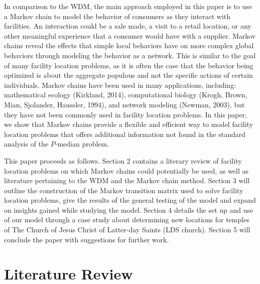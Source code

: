 \documentclass[twoside,twocolumn]{article}
\begin{document}
In comparison to the WDM, the main approach employed in this paper is to use a Markov chain to model the behavior of consumers as they interact with facilities. 
An interaction could be a sale made, a visit to a retail location, or any other meaningful experience that a consumer would have with a supplier. %
Markov chains reveal the effects that simple local behaviors have on more complex global behaviors through modeling the behavior as a network.
This is similar to the goal of many facility location problems, as it is often the case that the behavior being optimized is about the aggregate populous and not the specific actions of certain individuals.
Markov chains have been used in many applications, including: mathematical ecology (Kirkland, 2014), computational biology (Krogh, Brown, Mian, Sjolander, Haussler, 1994), and network modeling (Newman, 2003), but they have not been commonly used in facility location problems.
In this paper, we show that Markov chains provide a flexible and efficient way to model facility location problems that offers additional information not found in the standard analysis of the $P$-median problem.

This paper proceeds as follows.
Section 2 contains a literary review of facility location problems on which Markov chains could potentially be used, as well as literature pertaining to the WDM and the Markov chain method. %
Section 3 will outline the construction of the Markov transition matrix used to solve facility location problems, give the results of the general testing of the model and expand on insights gained while studying the model.
Section 4 details the set up and use of our model through a case study about determining new locations for temples of The Church of Jesus Christ of Latter-day Saints (LDS church).  %
Section 5 will conclude the paper with suggestions for further work.

\section{Literature Review}
\end{document}

